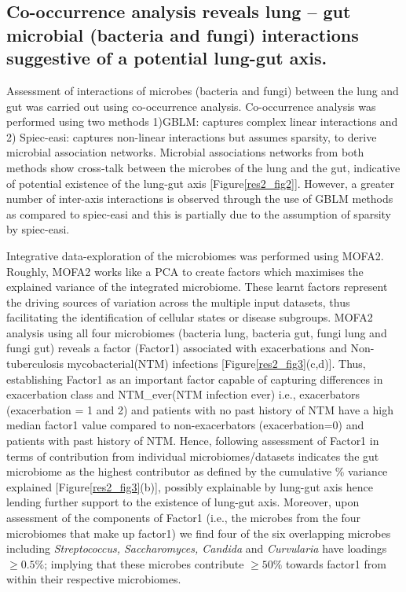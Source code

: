 \subsection{Co-occurrence analysis reveals lung – gut microbial (bacteria and fungi) interactions suggestive of a potential lung-gut axis.}
Assessment of interactions of microbes (bacteria and fungi) between the lung and gut was carried out using co-occurrence analysis. Co-occurrence analysis was performed using two methods 1)GBLM: captures complex linear interactions and 2) Spiec-easi: captures non-linear interactions but assumes sparsity, to derive microbial association networks. Microbial associations networks from both methods show cross-talk between the microbes of the lung and the gut, indicative of potential existence of the lung-gut axis [Figure\ref{res2_fig2}]. However, a greater number of inter-axis interactions is observed through the use of GBLM methods as compared to spiec-easi and this is partially due to the assumption of sparsity by spiec-easi. 

Integrative data-exploration of the microbiomes was performed using MOFA2. Roughly, MOFA2 works like a PCA to create factors which maximises the explained variance of the integrated microbiome. These learnt factors represent the driving sources of variation across the multiple input datasets, thus facilitating the identification of cellular states or disease subgroups. MOFA2 analysis using all four microbiomes (bacteria lung, bacteria gut, fungi lung and fungi gut) reveals a factor (Factor1) associated with exacerbations and Non-tuberculosis mycobacterial(NTM) infections [Figure\ref{res2_fig3}(c,d)]. Thus, establishing Factor1 as an important factor capable of capturing differences in exacerbation class and NTM\_ever(NTM infection ever) i.e., exacerbators (exacerbation = 1 and 2) and patients with no past history of NTM have a high median factor1 value compared to non-exacerbators (exacerbation=0) and patients with past history of NTM. Hence, following assessment of Factor1 in terms of contribution from individual microbiomes/datasets indicates the gut microbiome as the highest contributor as defined by the cumulative \% variance explained [Figure\ref{res2_fig3}(b)], possibly explainable by lung-gut axis hence lending further support to the existence of lung-gut axis. Moreover, upon assessment of the components of Factor1 (i.e., the microbes from the four microbiomes that make up factor1) we find four of the six overlapping microbes including \emph{Streptococcus, Saccharomyces, Candida} and \emph{Curvularia} have loadings $\geq 0.5\%$; implying that these microbes contribute $\geq 50\%$ towards factor1 from within their respective microbiomes.


